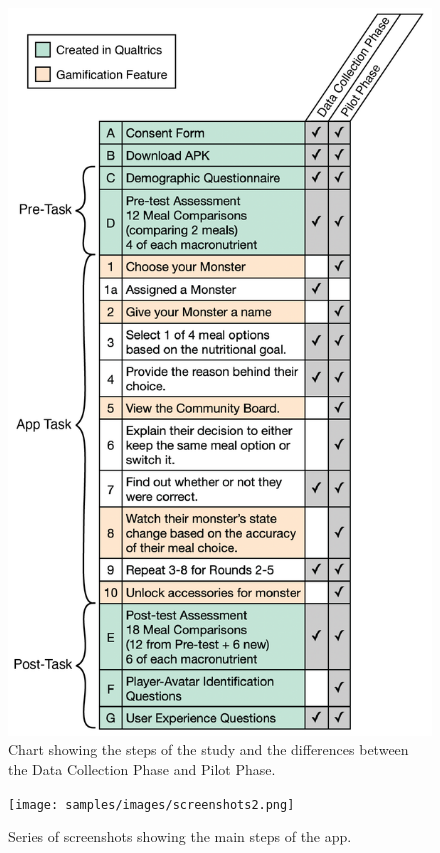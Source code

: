 \begin{figure}[!]
\includegraphics[scale=0.35]{samples/images/figure-2-02.png}
\caption{Chart showing the steps of the study and the differences between the Data Collection Phase and Pilot Phase.}
\label{fig:phasechart}
\end{figure}




\begin{figure}[h]
\texttt{[image: samples/images/screenshots2.png]}
\caption{Series of screenshots showing the main steps of the app. }
\label{fig:screenshots}
\end{figure}

